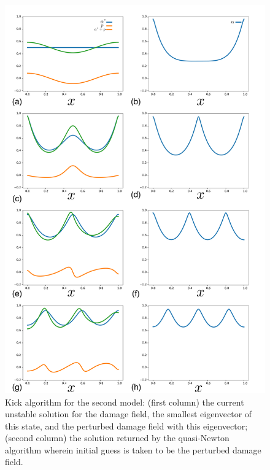 \begin{figure}
\includegraphics[width=\textwidth]{./final_images/fig7.pdf}
    \caption{Kick algorithm for the second model: (first column) the current unstable solution  for the damage field, the smallest eigenvector of this state, and the perturbed damage field with this eigenvector; (second column)  the solution returned by the quasi-Newton algorithm wherein initial guess is taken to be the perturbed damage field.
 }
 \label{fig:kick2}
\end{figure}


